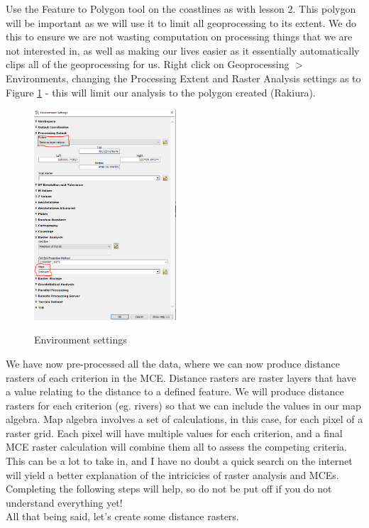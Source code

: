 \documentclass{article}
\begin{document}
Use the Feature to Polygon tool on the coastlines as with lesson 2. This polygon will be important as we will use it to limit all geoprocessing to its extent. We do this to ensure we are not wasting computation on processing things that we are not interested in, as well as making our lives easier as it essentially automatically clips all of the geoprocessing for us. Right click on Geoprocessing $>$ Environments, changing the Processing Extent and Raster Analysis settings as to Figure \ref{3_environments} - this will limit our analysis to the polygon created (Rakiura).
\pagebreak

\begin{figure}[h]
  \centering
  \caption{Environment settings}
  \includegraphics[width=200px]{images/part3/environments.PNG}
  \label{3_environments}
\end{figure}

We have now pre-processed all the data, where we can now produce distance rasters of each criterion in the MCE. Distance rasters are raster layers that have a value relating to the distance to a defined feature. We will produce distance rasters for each criterion (eg. rivers) so that we can include the values in our map algebra. Map algebra involves a set of calculations, in this case, for each pixel of a raster grid. Each pixel will have multiple values for each criterion, and a final MCE raster calculation will combine them all to assess the competing criteria. This can be a lot to take in, and I have no doubt a quick search on the internet will yield a better explanation of the intricicies of raster analysis and MCEs. Completing the following steps will help, so do not be put off if you do not understand everything yet!\\

All that being said, let's create some distance rasters. \\
\end{document}
